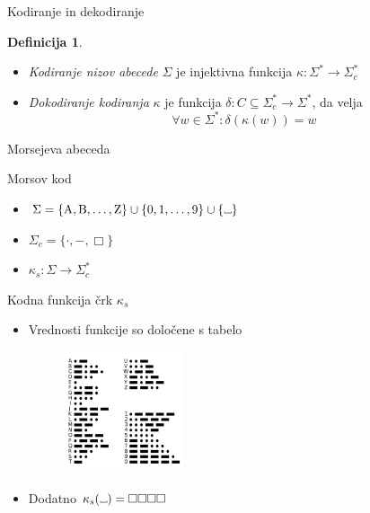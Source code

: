 \documentclass{beamer}
\theoremstyle{definition} %
\newtheorem{definicija}{Definicija}[section]
\newcommand\Vtextvisiblespace[1][.3em]{%
\mbox{\kern.06em\vrule height.3ex}%
\vbox{\hrule width#1}%
\hbox{\vrule height.3ex}}
\begin{document}
\begin{frame}{Kodiranje in dekodiranje}
    \begin{definicija}
        \begin{itemize}
            \item \textit{Kodiranje nizov abecede} $ \Sigma $ je injektivna funkcija $ \kappa \colon \Sigma^* 
            \to \Sigma_c^* $
            \item<2-> \textit{Dokodiranje kodiranja} $ \kappa $ je funkcija 
            $ \delta \colon C \subseteq \Sigma^*_c \to \Sigma^* $, da velja
            \[
                \forall w \in \Sigma^* \colon \delta(\kappa(w)) = w
            \]
        \end{itemize}
    \end{definicija}
\end{frame}

\begin{frame}{Morsejeva abeceda}
    \begin{block}{Morsov kod}
        \begin{itemize}
            \item<2->  $ \Sigma = \{ \text{A},  \text{B}, \ldots, \text{Z} \} \cup \{ 0, 1, \ldots, 9 \}
            \cup \{ \Vtextvisiblespace[5pt] \} $
            \item<3-> $ \Sigma_c = \{ \cdot ,-, \Box \} $
            \item<4-> $ \kappa_s \colon \Sigma \to \Sigma_c^* $ \\ \phantom{}
        \end{itemize}
    \end{block}
\end{frame}

\begin{frame}
    \begin{block}{Kodna funkcija črk $ \kappa_s $}
        \begin{itemize}
            \item Vrednosti funkcije so določene s tabelo
            \begin{figure}[h]
                \centering
                \includegraphics[width=3.5cm]{International_Morse_Code.svg.png}
            \end{figure}
            \item Dodatno $ \kappa_s(\Vtextvisiblespace[5pt]) = \Box\Box\Box\Box $
        \end{itemize}
    \end{block}
\end{frame}
\end{document}
